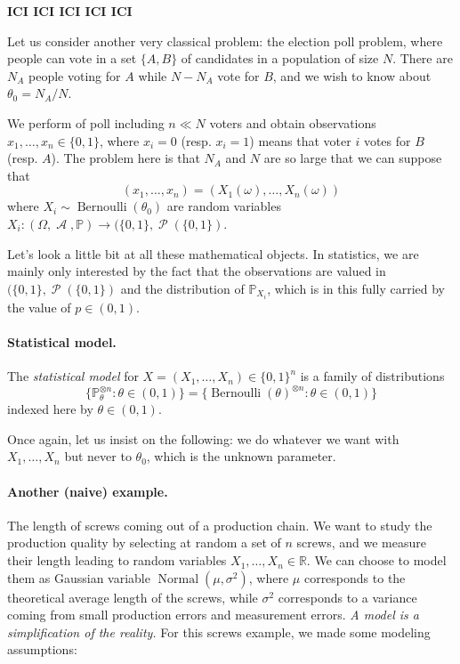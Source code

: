 \documentclass[
	fontsize=11pt, %
	twoside=false, %
	numbers=noenddot, %
]{kaobook}
\DeclareMathOperator{\cA}{\mathcal A}
\DeclareMathOperator{\cP}{\mathcal P}
\DeclareMathOperator{\nor}{Normal}
\DeclareMathOperator{\ber}{Bernoulli}
\renewcommand{\P}{\mathbb P}
\newcommand{\R}{\mathbb R}
\begin{document}
\textbf{ICI ICI ICI ICI ICI}

Let us consider another very classical problem: the election poll problem, where people can vote in a set $\{A, B\}$ of candidates in a population of size $N$.
There are $N_A$ people voting for $A$ while $N - N_A$ vote for $B$, and we wish to know about $\theta_0 = N_A / N$.

We perform of poll including $n \ll N$ voters and obtain observations $x_1, \ldots, x_n \in \{ 0, 1 \}$, where $x_i = 0$ (resp. $x_i = 1$) means that voter $i$ votes for $B$ (resp. $A$).
The problem here is that $N_A$ and $N$ are so large that we can suppose that
\begin{equation*}
	(x_1, \ldots, x_n) = (X_1(\omega), \ldots, X_n(\omega))
\end{equation*}
where $X_i \sim \ber(\theta_0)$ are random variables $X_i : (\Omega, \cA, \P) \rightarrow (\{0, 1\}, \cP(\{ 0, 1\})$.

Let's look a little bit at all these mathematical objects. 
In statistics, we are mainly only interested by the fact that the observations are valued in $(\{0, 1\}, \cP(\{ 0, 1\})$ and the distribution of $\P_{X_i}$, which is in this fully carried by the value of $p \in (0, 1)$.
\todo{dire qu'on s'en fout de $\Omega, \cA, \P$ etc.}

\paragraph{Statistical model.}

The \emph{statistical model} for $X = (X_1, \ldots, X_n) \in \{0, 1\}^n$ is a family of distributions
\begin{equation}
	\{ \P_\theta^{\otimes n} : \theta \in (0, 1) \}	= \{ \ber(\theta)^{\otimes n} : \theta \in (0, 1) \}
\end{equation}
indexed here by $\theta \in (0, 1)$.

Once again, let us insist on the following: we do whatever we want with $X_1, \ldots, X_n$ but never to $\theta_0$, which is the unknown parameter.


\paragraph{Another (naive) example.}

The length of screws coming out of a production chain.
We want to study the production quality by selecting at random a set of $n$ screws, and we measure their length leading to random variables $X_1, \ldots, X_n \in \R$.
We can choose to model them as Gaussian variable $\nor(\mu, \sigma^2)$, where $\mu$ corresponds to the theoretical average length of the screws, while $\sigma^2$ corresponds to a variance coming from small production errors and measurement errors.
\emph{A model is a simplification of the reality.} For this screws example, we made some modeling assumptions:
\end{document}
